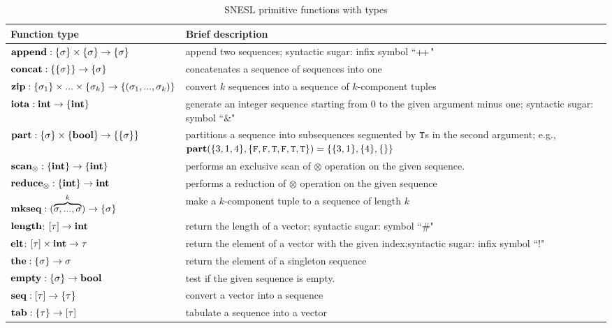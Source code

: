 \begin{table}\large
	\renewcommand\arraystretch{1.5}
	\centering
	\begin{tabular}{|p{}|p{}|}
		\hline
		Function type & Brief description  \\ \hline
		$\mathbf{append : \{\sigma\} \times \{\sigma\} \rightarrow \{\sigma\}}$ & append two sequences; syntactic sugar: infix symbol ``${\++}$" \\ \hline
		$\mathbf{concat: \{\{\sigma\}\} \rightarrow \{\sigma\} }$ &  concatenates a sequence of sequences into one                    \\ \hline
		$\mathbf{zip}: \{\sigma_1\} \times ... \times \{\sigma_k\}  \rightarrow \{(\sigma_1,...,\sigma_k)\}$ & convert $k$ sequences into a sequence of $k$-component tuples \\ \hline
		$\mathbf{iota: \mathbf{int} \rightarrow \{\mathbf{int}\}}$  &  generate an integer sequence starting from 0 to the given argument minus one; syntactic sugar: symbol ``\&"    \\ \hline
		$\mathbf{part: \{\sigma\} \times \{\mathbf{bool}\} \rightarrow  \{\{\sigma\}\}}$   & partitions a sequence into subsequences segmented by $\mathtt{T}$s in the second argument; e.g., $\mathbf{part}(\{3,1,4\}, \{\mathtt{F},\mathtt{F},\mathtt{T},\mathtt{F},\mathtt{T},\mathtt{T}\}) = \{\{3,1\},\{4\},\{\}\}$                \\ \hline
		$\mathbf{scan_\otimes}: \{\mathbf{int}\} \rightarrow \{\mathbf{int}\}$     &  performs an exclusive scan of $\otimes$ operation on the given sequence.    \\ \hline
		$\mathbf{reduce_\otimes: \{\mathbf{int}\} \rightarrow \mathbf{int} }$     &   performs a reduction of $\otimes$ operation on the given sequence             \\ \hline
		$\mathbf{mkseq}: (\overbrace{\sigma,...,\sigma}^{k}) \rightarrow \{\sigma\}$  & make a $k$-component tuple to a sequence of length $k$ \\ \hline  
	    $\mathbf{length}$: $[\tau] \rightarrow \mathbf{int}$ & return the length of a vector; syntactic sugar: symbol ``\#" \\ \hline  
	    $\mathbf{elt}$: $[\tau] \times \mathbf{int} \rightarrow \tau$  & return the  element of a vector with the given index;syntactic sugar: infix symbol ``!" \\ \hline  
	    $\mathbf{the:  \{\sigma\} \rightarrow \sigma}$     &     return the element of a singleton sequence           \\ \hline
	    $\mathbf{empty:  \{\sigma\} \rightarrow \mathbf{bool}}$       & test if the given sequence is empty.             \\ \hline  
	    $\mathbf{seq}: [\tau] \rightarrow \{\tau\} $  & convert a vector into a sequence \\ \hline  
	    $\mathbf{tab}: \{\tau\} \rightarrow [\tau] $  & tabulate a sequence into a vector\\ \hline  
	\end{tabular}
	\caption{SNESL primitive functions with types}
	\label{tab:snesl-funcs}
\end{table}




